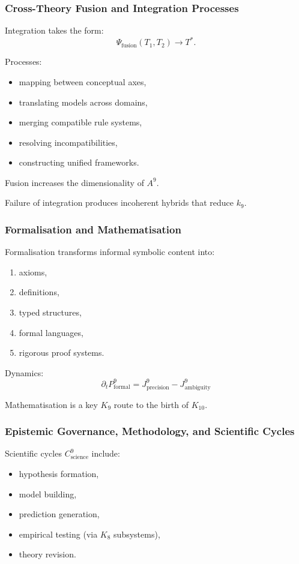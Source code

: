 \subsubsection{Cross-Theory Fusion and Integration Processes}

Integration takes the form:
\[
\Psi_{\text{fusion}}(T_1, T_2) \to T^{*}.
\]

Processes:
\begin{itemize}
    \item mapping between conceptual axes,
    \item translating models across domains,
    \item merging compatible rule systems,
    \item resolving incompatibilities,
    \item constructing unified frameworks.
\end{itemize}

Fusion increases the dimensionality of $A^9$.

Failure of integration produces incoherent hybrids 
that reduce $k_9$.

\subsubsection{Formalisation and Mathematisation}

Formalisation transforms informal symbolic content into:
\begin{enumerate}
    \item axioms,
    \item definitions,
    \item typed structures,
    \item formal languages,
    \item rigorous proof systems.
\end{enumerate}

Dynamics:
\[
\partial_t P^9_{\text{formal}} 
= J^9_{\text{precision}} - J^9_{\text{ambiguity}}
\]

Mathematisation is a key $K_9$ route to the birth of $K_{10}$.

\subsubsection{Epistemic Governance, Methodology, and Scientific Cycles}

Scientific cycles $C^9_{\text{science}}$ include:
\begin{itemize}
    \item hypothesis formation,
    \item model building,
    \item prediction generation,
    \item empirical testing (via $K_8$ subsystems),
    \item theory revision.
\end{itemize}

